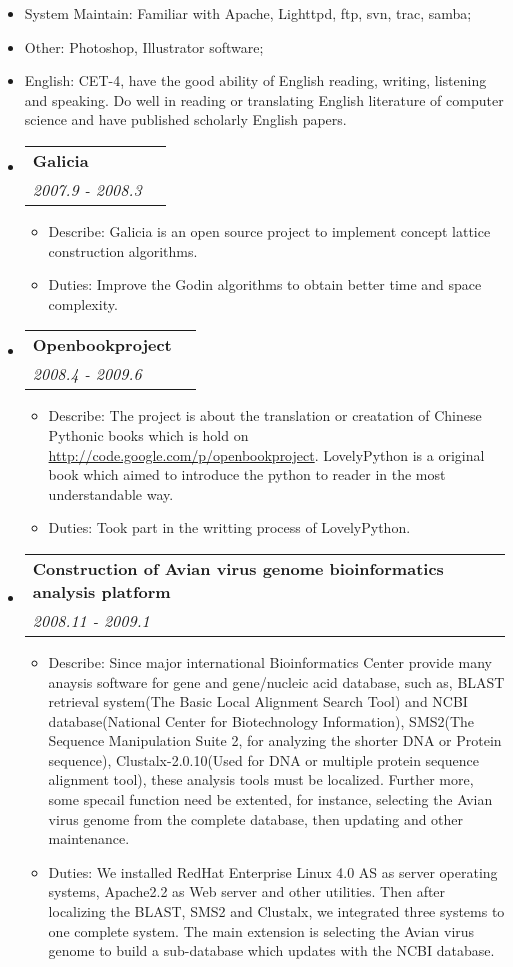 \documentclass[letterpaper,11pt]{article}
\makeatletter
\newcommand{\resitem}[1]{\item #1 \vspace{-2pt}}
\newcommand{\resheading}[1]{{\large \parashade[.9]{sharpcorners}{\textbf{#1 \vphantom{p\^{E}}}}}}
\newcommand{\ressubheading}[4]{
\begin{tabular*}{6.5in}{l@{\extracolsep{\fill}}r}
        \textbf{#1} & #2 \\
        \textit{#3} & \textit{#4} \\
\end{tabular*}\vspace{-6pt}}
\makeatother
\begin{document}
\begin{CJK*}{GBK}{kai}
\begin{itemize}
\item{System Maintain:}
Familiar with Apache, Lighttpd, ftp, svn, trac, samba;
\item{Other:}
Photoshop, Illustrator software;
\item{English:}
CET-4, have the good ability of English reading, writing, listening
and speaking. Do well in reading or translating English literature
of computer science and have published scholarly English papers.
\end{itemize}

\resheading{Project Experience}
\begin{itemize}

\item
    \ressubheading{Galicia}{}{2007.9 - 2008.3}{}
    \begin{itemize}
        \resitem{   Describe: Galicia is an open source project to implement concept lattice construction algorithms.}
        \resitem{   Duties: Improve the Godin algorithms to obtain better time and space complexity.}
    \end{itemize}

\item
    \ressubheading{Openbookproject}{}{2008.4 - 2009.6}{}
    \begin{itemize}
        \resitem{   Describe: The project is about the translation or creatation of Chinese Pythonic books which is hold on \href{http://code.google.com/p/openbookproject/}{http://code.google.com/p/openbookproject}. LovelyPython is a original book which aimed to introduce the python to reader in the most understandable way.}
        \resitem{   Duties: Took part in the writting process of LovelyPython.}
    \end{itemize}

\item
    \ressubheading{Construction of Avian virus genome bioinformatics analysis platform}{}{2008.11 - 2009.1}{}
    \begin{itemize}
        \resitem{   Describe: Since major international Bioinformatics Center provide many anaysis software for gene and gene/nucleic acid database, such as, BLAST retrieval system(The Basic Local Alignment Search Tool) and NCBI database(National Center for Biotechnology Information), SMS2(The Sequence Manipulation Suite 2, for analyzing the shorter DNA or Protein sequence), Clustalx-2.0.10(Used for DNA or multiple protein sequence alignment tool), these analysis tools must be localized. Further more, some specail function need be extented, for instance, selecting the Avian virus genome from the complete database, then updating and other maintenance.}
        \resitem{   Duties: We installed RedHat Enterprise Linux 4.0 AS as server operating systems, Apache2.2 as Web server and other utilities. Then after localizing the BLAST, SMS2 and Clustalx, we integrated three systems to one complete system. The main extension is selecting the Avian virus genome to build a sub-database which updates with the NCBI database.}
    \end{itemize}


\end{itemize}
\end{CJK*}
\end{document}
